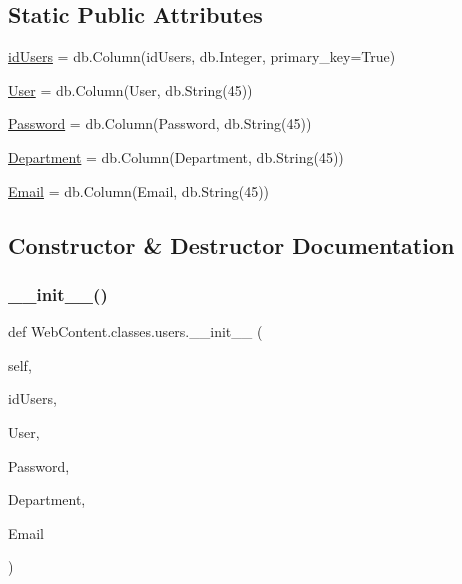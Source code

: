 \subsection*{Static Public Attributes}
\begin{DoxyCompactItemize}
\item 
\hyperlink{class_web_content_1_1classes_1_1users_ac626a21b539eab7dfd3170533ff98fad}{id\+Users} = db.\+Column(\textquotesingle{}id\+Users\textquotesingle{}, db.\+Integer, primary\+\_\+key=True)
\item 
\hyperlink{class_web_content_1_1classes_1_1users_a083d6c2ba8164a0edfdfba1e889829a4}{User} = db.\+Column(\textquotesingle{}User\textquotesingle{}, db.\+String(45))
\item 
\hyperlink{class_web_content_1_1classes_1_1users_a5e0e733ebeee5a02bcf563995196f295}{Password} = db.\+Column(\textquotesingle{}Password\textquotesingle{}, db.\+String(45))
\item 
\hyperlink{class_web_content_1_1classes_1_1users_a0cff7737b58d91bf3502af5813c811d2}{Department} = db.\+Column(\textquotesingle{}Department\textquotesingle{}, db.\+String(45))
\item 
\hyperlink{class_web_content_1_1classes_1_1users_aa3bdfac54124d297b6ac81a2ba5564f7}{Email} = db.\+Column(\textquotesingle{}Email\textquotesingle{}, db.\+String(45))
\end{DoxyCompactItemize}


\subsection{Constructor \& Destructor Documentation}
\mbox{\label{class_web_content_1_1classes_1_1users_aa7a3c863509284695380f9e80022fbb7}} 
\subsubsection{\texorpdfstring{\+\_\+\+\_\+init\+\_\+\+\_\+()}{\_\_init\_\_()}}
{\footnotesize\ttfamily def Web\+Content.\+classes.\+users.\+\_\+\+\_\+init\+\_\+\+\_\+ (\begin{DoxyParamCaption}\item[{}]{self,  }\item[{}]{id\+Users,  }\item[{}]{User,  }\item[{}]{Password,  }\item[{}]{Department,  }\item[{}]{Email }\end{DoxyParamCaption})}



